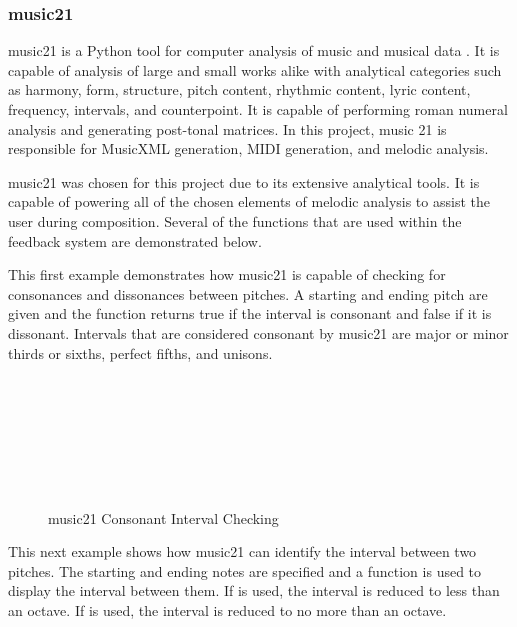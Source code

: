 \subsubsection{music21}
\label{subsubsec:music21}

music21 is a Python tool for computer analysis of music and musical data \cite{Cuthbert_2020}.  It is capable of analysis of large and small works alike with analytical categories such as harmony, form, structure, pitch content, rhythmic content, lyric content, frequency, intervals, and counterpoint.  It is capable of performing roman numeral analysis and generating post-tonal matrices.  In this project, music 21 is responsible for MusicXML generation, MIDI generation, and melodic analysis.

\vspace{\baselineskip}

music21 was chosen for this project due to its extensive analytical tools.  It is capable of powering all of the chosen elements of melodic analysis to assist the user during composition.  Several of the functions that are used within the feedback system are demonstrated below.

\vspace{\baselineskip}

This first example demonstrates how music21 is capable of checking for consonances and dissonances between pitches.  A starting and ending pitch are given and the function returns true if the interval is consonant and false if it is dissonant.  Intervals that are considered consonant by music21 are major or minor thirds or sixths, perfect fifths, and unisons.

\begin{figure}[!htbp]
	\caption{music21 Consonant Interval Checking \cite{Cuthbert_2020}}
	 \\
	 \\
	 \\
	 \\
	 \\
	 \\
\end{figure}

This next example shows how music21 can identify the interval between two pitches.  The starting and ending notes are specified and a function is used to display the interval between them.  If  is used, the interval is reduced to less than an octave.  If  is used, the interval is reduced to no more than an octave.

